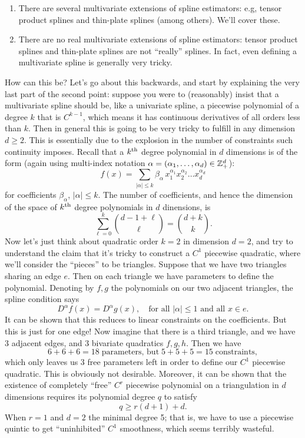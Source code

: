 \documentclass{article}
\begin{document}
\begin{enumerate}
\item There are several multivariate extensions of spline estimators: e.g,
  tensor product splines and thin-plate splines (among others). We'll cover
  these. 
\item There are no real multivariate extensions of spline estimators: tensor
  product splines and thin-plate splines are not ``really'' splines. In fact,
  even defining a multivariate spline is generally very tricky. 
\end{enumerate}

How can this be? Let's go about this backwards, and start by explaining the very
last part of the second point: suppose you were to (reasonably) insist that a 
multivariate spline should be, like a univariate spline, a piecewise polynomial
of a degree $k$ that is $C^{k-1}$, which means it has continuous derivatives of
all orders less than $k$. Then in general this is going to be very tricky to
fulfill in any dimension $d \geq 2$. This is essentially due to the explosion in 
the number of constraints such continuity imposes. Recall that a $k^{\text{th}}$ degree 
polynomial in $d$ dimensions is of the form (again using multi-index notation
$\alpha = (\alpha_1,\dots,\alpha_d) \in \mathbb{Z}^d_+$):         
\begin{equation}
\label{eq:poly}
f(x) = \sum_{|\alpha| \leq k} \beta_\alpha \, x_1^{\alpha_1} x_2^{\alpha_2}
\dots x_d^{\alpha_d}   
\end{equation}
for coefficients $\beta_\alpha$, $|\alpha| \leq k$. The number of coefficients,
and hence the dimension of the space of $k^{\text{th}}$ degree polynomials in $d$
dinensions, is
\[
\sum_{\ell=0}^k {d-1+\ell \choose \ell} = {d + k \choose k}.
\]
Now let's just think about quadratic order $k=2$ in dimension $d=2$, and try to
understand the claim that it's tricky to construct a $C^1$ piecewise quadratic, 
where we'll consider the ``pieces'' to be triangles. Suppose that we have two 
triangles sharing an edge $e$. Then on each triangle we have  parameters to define the polynomial. Denoting by $f,g$ the
polynomials on our two adjacent triangles, the spline condition says    
\[
D^\alpha f(x) = D^\alpha g(x), \quad \text{for all $|\alpha| \leq 1$ and all $x
  \in e$}. 
\] 
It can be shown that this reduces to  
linear constraints on the coefficients. But this is just for one edge! Now
imagine that there is a third triangle, and we have 3 adjacent edges, and 3 
bivariate quadratics $f,g,h$. Then we have  
\[
6+6+6 = 18 \; \text{parameters, but} \; 5+5+5 = 15 \; \text{constraints},    
\]
which only leaves us 3 free parameters left in order to define our $C^1$
piecewise quadratic. This is obviously not desirable. Moreover, it can be shown
that the existence of completely ``free'' $C^r$ piecewise polynomial on a
triangulation in $d$ dimensions requires its polynomial degree $q$ to satisfy  
\[
q \geq r(d+1) + d.
\]
When $r=1$ and $d=2$ the minimal degree 5; that is, we have to use a piecewise  
quintic to get ``uninhibited'' $C^1$ smoothness, which seems terribly wasteful. 
\end{document}
